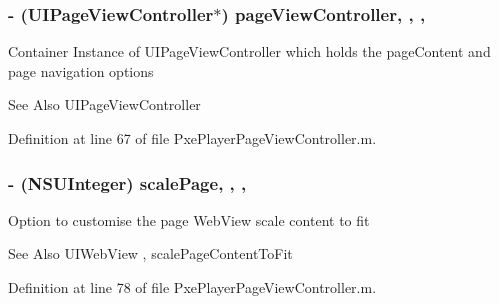 \hypertarget{category_pxe_player_page_view_controller_07_08_a7a2a974b2f99a60d2557c304281e6226}{
\subsubsection[{page\-View\-Controller}]{\setlength{\rightskip}{0pt plus 5cm}-\/ (U\-I\-Page\-View\-Controller$\ast$) page\-View\-Controller\hspace{0.3cm}{\ttfamily [read]}, {\ttfamily [write]}, {\ttfamily [nonatomic]}, {\ttfamily [strong]}}}\label{category_pxe_player_page_view_controller_07_08_a7a2a974b2f99a60d2557c304281e6226}
Container Instance of U\-I\-Page\-View\-Controller which holds the page\-Content and page navigation options \begin{DoxySeeAlso}{See Also}
U\-I\-Page\-View\-Controller 
\end{DoxySeeAlso}


Definition at line 67 of file Pxe\-Player\-Page\-View\-Controller.\-m.

\hypertarget{category_pxe_player_page_view_controller_07_08_a2d0cd55db172a5b8d943ab0ad47d555d}{
\subsubsection[{scale\-Page}]{\setlength{\rightskip}{0pt plus 5cm}-\/ (N\-S\-U\-Integer) scale\-Page\hspace{0.3cm}{\ttfamily [read]}, {\ttfamily [write]}, {\ttfamily [nonatomic]}, {\ttfamily [assign]}}}\label{category_pxe_player_page_view_controller_07_08_a2d0cd55db172a5b8d943ab0ad47d555d}
Option to customise the page Web\-View scale content to fit \begin{DoxySeeAlso}{See Also}
U\-I\-Web\-View , scale\-Page\-Content\-To\-Fit 
\end{DoxySeeAlso}


Definition at line 78 of file Pxe\-Player\-Page\-View\-Controller.\-m.

